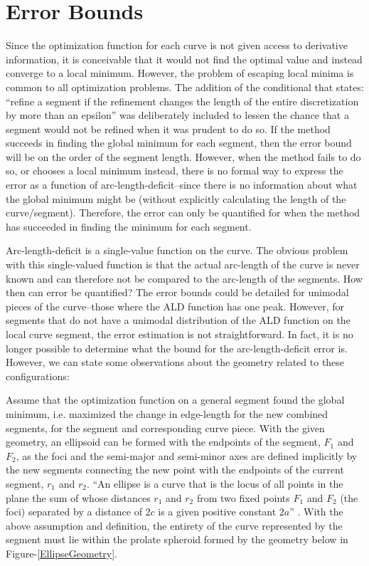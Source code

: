 \section{Error Bounds}
Since the optimization function for each curve is not given access to derivative information, it is conceivable that it would not find the optimal value and instead converge to a local minimum.  However, the problem of escaping local minima is common to all optimization problems.  The addition of the conditional that states: ``refine a segment if the refinement changes the length of the entire discretization by more than an epsilon'' was deliberately included to lessen the chance that a segment would not be refined when it was prudent to do so.  If the method succeeds in finding the global minimum for each segment, then the error bound will be on the order of the segment length.  However, when the method fails to do so, or chooses a local minimum instead, there is no formal way to express the error as a function of arc-length-deficit--since there is no information about what the global minimum might be (without explicitly calculating the length of the curve/segment).  Therefore, the error can only be quantified for when the method has succeeded in finding the minimum for each segment.

Arc-length-deficit is a single-value function on the curve.  The obvious problem with this single-valued function is that the actual arc-length of the curve is never known and can therefore not be compared to the arc-length of the segments.  How then can error be quantified? The error bounds could be detailed for unimodal pieces of the curve--those where the ALD function has one peak.  However, for segments that do not have a unimodal distribution of the ALD function on the local curve segment, the error estimation is not straightforward.  In fact, it is no longer possible to determine what the bound for the arc-length-deficit error is.  However, we can state some observations about the geometry related to these configurations:

Assume that the optimization function on a general segment found the global minimum, i.e. maximized the change in edge-length for the new combined segments, for the segment and corresponding curve piece.  With the given geometry, an ellipsoid can be formed with the endpoints of the segment, $F_1$ and $F_2$, as the foci and the semi-major and semi-minor axes are defined implicitly by the new segments connecting the new point with the endpoints of the current segment, $r_1$ and $r_2$.  ``An ellipse is a curve that is the locus of all points in the plane the sum of whose distances $r_1$ and $r_2$ from two fixed points $F_1$ and $F_2$ (the foci) separated by a distance of $2c$ is a given positive constant $2a$'' \cite{weissteine}.  With the above assumption and definition, the entirety of the curve represented by the segment must lie within the prolate spheroid  formed by the geometry below in Figure-\ref{EllipseGeometry}.

